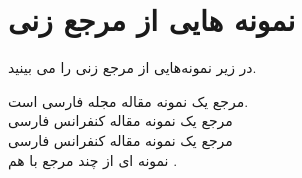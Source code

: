 \section{ نمونه‌ هایی از مرجع زنی}\label{seq:4.1}
 در زیر نمونه‌هایی از مرجع زنی را می بینید.
 
 مرجع \cite{Vahedi87} یک نمونه مقاله مجله فارسی است.\\
مرجع \cite{Amintoosi87afzayesh}  یک نمونه  مقاله کنفرانس فارسی \\
مرجع \citep{Amintoosi87afzayesh}  یک نمونه  مقاله کنفرانس فارسی \\
نمونه ای از چند مرجع با هم \cite{Eschrig2003,Koepernik1997,Opahle1999}.